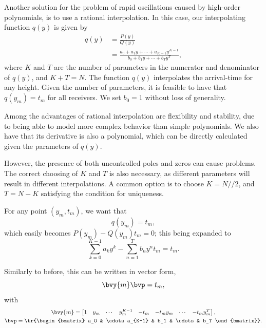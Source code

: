 Another solution for the problem of rapid oscillations caused by high-order polynomials, is to use a rational interpolation. In this case, our interpolating function $q(y)$ is given by
\begin{equation}
	\begin{split}
		q(y) 
		& = \frac{P(y)}{Q(y)}\\
		& = \frac{a_0 + a_1 y + \cdots + a_{K-1}y^{K-1}}{b_0 + b_1 y + \cdots + b_{T} y^{T}},
	\end{split}
\end{equation}
where $K$ and $T$ are the number of parameters in the numerator and denominator of $q(y)$, and $K+T=N$. The function $q(y)$ interpolates the arrival-time for any height. Given the number of parameters, it is feasible to have that $q(y_m) = t_m$ for all receivers. We set $b_0 = 1$ without loss of generality.

Among the advantages of rational interpolation are flexibility and stability, due to being able to model more complex behavior than simple polynomials. We also have that its derivative is also a polynomial, which can be directly calculated given the parameters of $q(y)$.

However, the presence of both uncontrolled poles and zeros can cause problems. The correct choosing of $K$ and $T$ is also necessary, as different parameters will result in different interpolations. A common option is to choose $K = N//2$, and $T = N-K$ satisfying the condition for uniqueness.

For any point $(y_m,t_m)$, we want that
\begin{equation}
	q(y_m) = t_m,
\end{equation}
which easily becomes $P(y_m) - Q(y_m) t_m= 0$; this being expanded to
\begin{equation}
 \sum_{k=0}^{K-1} a_k y^k - \sum_{n=1}^{T} b_n y^n t_m = t_m.
\end{equation}

Similarly to before, this can be written in vector form,
\begin{equation}
	\bvy{m} \bvp = t_m,
\end{equation}
with
\begin{subequations}
	\begin{gather}
		\bvy{m} = \begin{bmatrix}
			1 & y_m & \cdots & y_m^{K-1} & -t_m & -t_m y_m & \cdots & -t_m y_m^T
		\end{bmatrix}, \\
		\bvp = \tr{\begin{bmatrix}
			a_0 & \cdots a_{K-1} & b_1 & \cdots & b_T
		\end{bmatrix}}.
	\end{gather}
\end{subequations}

